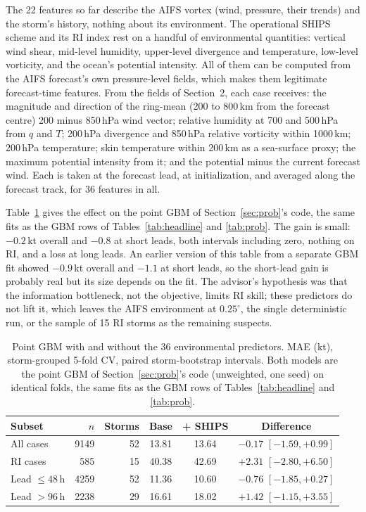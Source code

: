 \documentclass[11pt]{article}
\begin{document}
The 22 features so far describe the AIFS vortex (wind, pressure, their trends) and the storm's
history, nothing about its environment. The operational SHIPS scheme
\citep{demaria1994ships, demaria2005ships} and its RI index \citep{kaplan2003ri} rest on a handful
of environmental quantities: vertical wind shear, mid-level humidity, upper-level divergence and
temperature, low-level vorticity, and the ocean's potential intensity. All of them can be
computed from the AIFS forecast's own pressure-level fields, which makes them legitimate
forecast-time features. From the fields of Section~2, each case receives: the magnitude and
direction of the ring-mean (200 to 800\,km from the forecast centre) 200 minus 850\,hPa wind
vector; relative humidity at 700 and 500\,hPa from $q$ and $T$; 200\,hPa divergence and 850\,hPa
relative vorticity within 1000\,km; 200\,hPa temperature; skin temperature within 200\,km as a
sea-surface proxy; the \citet{demaria1994mpi} maximum potential intensity from it; and the
potential minus the current forecast wind. Each is taken at the forecast lead, at
initialization, and averaged along the forecast track, for 36 features in all.

Table~\ref{tab:ships} gives the effect on the point GBM of Section~\ref{sec:prob}'s code, the
same fits as the GBM rows of Tables~\ref{tab:headline} and \ref{tab:prob}. The gain is small:
$-0.2$\,kt overall and $-0.8$ at short leads, both intervals including zero, nothing on RI, and a
loss at long leads. An earlier version of this table from a separate GBM fit showed $-0.9$\,kt
overall and $-1.1$ at short leads, so the short-lead gain is probably real but its size depends
on the fit. The advisor's hypothesis was that
the information bottleneck, not the objective, limits RI skill; these predictors do not lift it,
which leaves the AIFS environment at $0.25^{\circ}$, the single deterministic run, or the sample
of 15 RI storms as the remaining suspects.

\begin{table}[t]
\centering
\caption{Point GBM with and without the 36 environmental predictors. MAE (kt), storm-grouped
5-fold CV, paired storm-bootstrap intervals. Both models are the point GBM of
Section~\ref{sec:prob}'s code (unweighted, one seed) on identical folds, the same fits as the GBM
rows of Tables~\ref{tab:headline} and \ref{tab:prob}.}
\label{tab:ships}
\begin{tabular}{lrrccc}
\toprule
Subset & $n$ & Storms & Base & + SHIPS & Difference \\
\midrule
All cases         & 9149 & 52 & 13.81 & 13.64 & $-0.17$ $[-1.59, +0.99]$ \\
RI cases          &  585 & 15 & 40.38 & 42.69 & $+2.31$ $[-2.80, +6.50]$ \\
Lead $\le 48$\,h  & 4259 & 52 & 11.36 & 10.60 & $-0.76$ $[-1.85, +0.27]$ \\
Lead $> 96$\,h    & 2238 & 29 & 16.61 & 18.02 & $+1.42$ $[-1.15, +3.55]$ \\
\bottomrule
\end{tabular}
\end{table}
\end{document}
